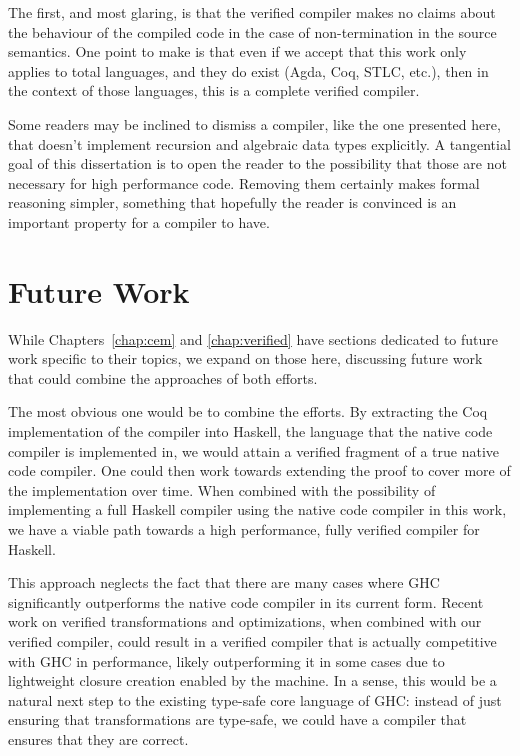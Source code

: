 The first, and most glaring, is that the verified compiler makes no claims about
the behaviour of the compiled code in the case of non-termination in the source
semantics. One point to make is that even if we accept that this work only
applies to total languages, and they do exist (Agda, Coq, STLC, etc.), then in
the context of those languages, this is a complete verified compiler. 

Some readers may be inclined to dismiss a compiler, like the one presented here,
that doesn't implement recursion and algebraic data types explicitly. A
tangential goal of this dissertation is to open the reader to the possibility
that those are not necessary for high performance code. Removing them certainly
makes formal reasoning simpler, something that hopefully the reader is convinced
is an important property for a compiler to have.  

\section{Future Work}\label{sec:future}

While Chapters~\ref{chap:cem} and \ref{chap:verified} have sections dedicated to
future work specific to their topics, we expand on those here, discussing future
work that could combine the approaches of both efforts. 

The most obvious one would be to combine the efforts. By extracting the Coq
implementation of the compiler into Haskell, the language that the native code
compiler is implemented in, we would attain a verified fragment of a true native
code compiler. One could then work towards extending the proof to cover more of
the implementation over time. When combined with the possibility of implementing
a full Haskell compiler using the native code compiler in this work, we have a
viable path towards a high performance, fully verified compiler for Haskell. 

This approach neglects the fact that there are many cases where GHC
significantly outperforms the native code compiler in its current form. Recent
work on verified transformations and optimizations, when combined with our
verified compiler, could result in a verified compiler that is actually
competitive with GHC in performance, likely outperforming it in some cases due
to lightweight closure creation enabled by the \ce machine. In a sense, this
would be a natural next step to the existing type-safe core language of GHC:
instead of just ensuring that transformations are type-safe, we could have a
compiler that ensures that they are correct.

